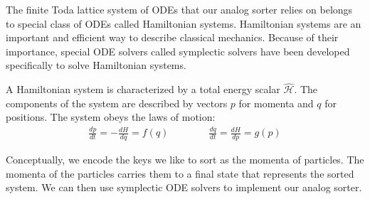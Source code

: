 \newcommand*{\hham}{\hat{\mathcal{H}}}
The finite Toda lattice system of ODEs that our analog sorter relies on belongs to special class of ODEs called Hamiltonian systems.
Hamiltonian systems are an important and efficient way to describe classical mechanics.
Because of their importance, special ODE solvers called symplectic solvers have been developed specifically to solve Hamiltonian systems.

A Hamiltonian system is characterized by a total energy scalar $\hham$.
The components of the system are described by vectors $p$ for momenta and $q$ for positions.
The system obeys the laws of motion:
\begin{align}
\frac{dp}{dt} = -\frac{dH}{dq} = f(q) \qquad \qquad
\frac{dq}{dt} = \frac{dH}{dp} = g(p)
\end{align}

Conceptually, we encode the keys we like to sort as the momenta of particles.
The momenta of the particles carries them to a final state that represents the sorted system.
We can then use symplectic ODE solvers to implement our analog sorter.